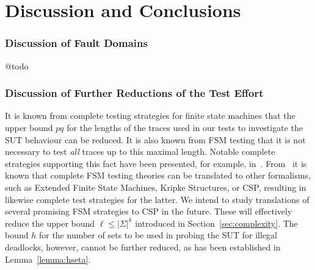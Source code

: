 \section{Discussion and Conclusions}
\label{sec:conc}
\subsubsection*{Discussion of Fault Domains}

@todo


\subsubsection*{Discussion of Further Reductions of the Test Effort}
It is known from complete testing strategies for finite state machines that
the upper bound $pq$ for the lengths of the
traces used in our tests to investigate the SUT behaviour can be reduced. It is also
known from FSM testing that it is not necessary to test {\it all} traces up to this maximal length. Notable complete
strategies supporting this fact have been presented, for example,
 in~\cite{hierons_testing_2004,DBLP:conf/forte/DorofeevaEY05,petrenko_testing_2011,simao_reducing_2012}. From~\cite{Huang2017} it
 is known that complete
 FSM testing theories can be translated to other formalisms, such as
Extended Finite State Machines, Kripke Structures, or CSP, resulting in likewise complete
test strategies for the latter. We intend to study translations of several promising FSM
strategies to CSP in the future. These will effectively reduce the upper bound
$\ell\le |\Sigma|^k$ introduced in Section~\ref{sec:complexity}. The bound $h$ for
the number of sets to be used in probing the SUT for illegal deadlocks, however, cannot be further reduced, as has been established in Lemma~\ref{lemma:hseta}.


